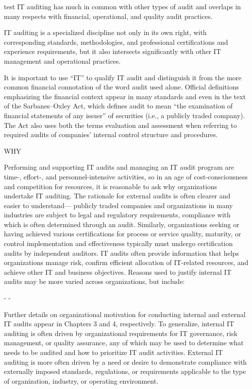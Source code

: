  {test}
IT auditing has much in common with other types of audit and overlaps in many respects with financial, operational, and quality audit practices.

IT auditing is a specialized discipline not only in its own right, with
corresponding standards, methodologies, and professional certifications and experience requirements, but it also intersects significantly with other IT management and
operational practices. 

It is important to use “IT” to qualify IT audit and distinguish it from the more common financial connotation of the word audit used alone. Official definitions emphasizing the financial context appear in many standards and even in the text of the Sarbanes–Oxley Act, which defines audit to mean “the examination of financial statements of any issuer” of securities (i.e., a publicly traded company). The Act also uses both the terms evaluation and assessment when referring to required audits of companies’ internal control structure and procedures.

WHY

Performing and supporting IT audits and managing an IT audit program are time-,
effort-, and personnel-intensive activities, so in an age of cost-consciousness and
competition for resources, it is reasonable to ask why organizations undertake IT
auditing. The rationale for external audits is often clearer and easier to understand—
publicly traded companies and organizations in many industries are subject to legal
and regulatory requirements, compliance with which is often determined through an
audit. Similarly, organizations seeking or having achieved various certifications for
process or service quality, maturity, or control implementation and effectiveness typically must undergo certification audits by independent auditors. IT audits often provide information that helps organizations manage risk, confirm efficient allocation of
IT-related resources, and achieve other IT and business objectives. Reasons used to
justify internal IT audits may be more varied across organizations, but include:

- 
- 

Further details on organizational motivation for conducting internal and external IT audits appear in Chapters  3 and 4, respectively. To generalize, internal IT
auditing is often driven by organizational requirements for IT governance, risk
management, or quality assurance, any of which may be used to determine what
needs to be audited and how to prioritize IT audit activities. External IT auditing
is more often driven by a need or desire to demonstrate compliance with externally
imposed standards, regulations, or requirements applicable to the type of organization, industry, or operating environment.

